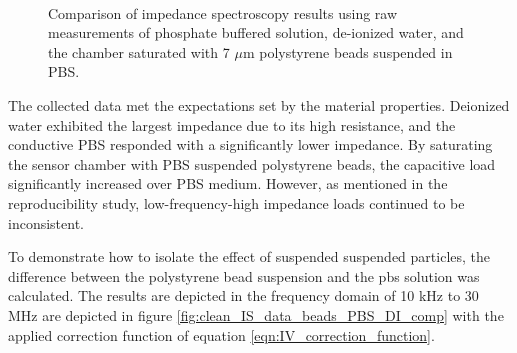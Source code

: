 \begin{figure}[h]
\begin{subfigure}[b]{0.9\textwidth}
    \end{subfigure}
    \\
    \caption[PBS, DI, microbead IS Raw data comparison.]{Comparison of impedance spectroscopy results using raw measurements of phosphate buffered solution, de-ionized water, and the chamber saturated with 7 $\mu$m polystyrene beads suspended in PBS.}
    \label{fig:IS_data_beads_pbs_DI_comp}
\end{figure}


\par The collected data met the expectations set by the material properties. Deionized water exhibited the largest impedance due to its high resistance, and the conductive PBS responded with a significantly lower impedance. By saturating the sensor chamber with PBS suspended polystyrene beads, the capacitive load significantly increased over PBS medium. However, as mentioned in the reproducibility study, low-frequency-high impedance loads continued to be inconsistent.

\par To demonstrate how to isolate the effect of suspended suspended particles, the difference between the polystyrene bead suspension and the pbs solution was calculated. The results are depicted in the frequency domain of 10 kHz to 30 MHz are depicted in figure \ref{fig:clean_IS_data_beads_PBS_DI_comp} with the applied correction function of equation \ref{eqn:IV_correction_function}.


